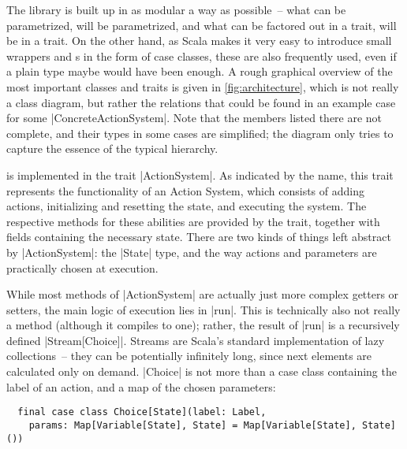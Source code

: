 The library is built up in as modular a way as possible~-- what can be parametrized, will be
parametrized, and what can be factored out in a trait, will be in a trait. On the other hand, as
Scala makes it very easy to introduce small wrappers and s in the form of case classes,
these are also frequently used, even if a plain type maybe would have been enough. A rough graphical
overview of the most important classes and traits is given in \autoref{fig:architecture}, which is
not really a class diagram, but rather the relations that could be found in an example case for some
|ConcreteActionSystem|. Note that the members listed there are not complete, and their types in some
cases are simplified; the diagram only tries to capture the essence of the typical hierarchy.

 is
implemented in the trait |ActionSystem|. As indicated by the name, this trait represents the
functionality of an Action System, which consists of adding actions, initializing and resetting the
state, and executing the system. The respective methods for these abilities are provided by the
trait, together with fields containing the necessary state. There are two kinds of things left
abstract by |ActionSystem|: the |State| type, and the way actions and parameters are practically
chosen at execution.

While most methods of |ActionSystem| are actually just more complex getters or setters, the main
logic of execution lies in |run|. This is technically also not really a method (although it compiles
to one); rather, the result of |run| is a recursively defined |Stream[Choice]|. Streams are Scala's
standard implementation of lazy collections~-- they can be potentially infinitely long, since next
elements are calculated only on demand. |Choice| is not more than a case class containing the label
of an action, and a map of the chosen parameters:
\begin{lstlisting}
  final case class Choice[State](label: Label,
    params: Map[Variable[State], State] = Map[Variable[State], State]())
\end{lstlisting}


